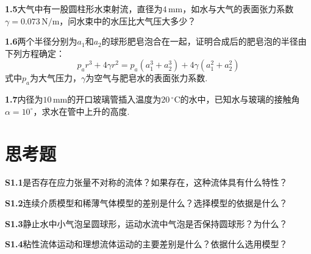 \medskip
\noindent\textbf{1.5}\quad 大气中有一股圆柱形水束射流，直径为$4\,$mm，如水与大气的表面张力系数$\gamma=0.073\,\mathrm{N/m}$，问水束中的水压比大气压大多少？

\medskip
\noindent\textbf{1.6}\quad 两个半径分别为$a_1$和$a_2$的球形肥皂泡合在一起，证明合成后的肥皂泡的半径由下列方程确定：
\[
p_a r^{3}+4\gamma r^{2}=p_a(a_1^{3}+a_2^{3})+4\gamma(a_1^{2}+a_2^{2})
\]
式中$p_a$为大气压力，$\gamma$为空气与肥皂水的表面张力系数.

\medskip
\noindent\textbf{1.7}\quad 内径为$10\,$mm的开口玻璃管插入温度为$20\,^\circ$C的水中，已知水与玻璃的接触角$\alpha=10^\circ$，求水在管中上升的高度.

\section*{思考题}

\noindent\textbf{S1.1}\quad 是否存在应力张量不对称的流体？如果存在，这种流体具有什么特性？

\medskip
\noindent\textbf{S1.2}\quad 连续介质模型和稀薄气体模型的差别是什么？选择模型的依据是什么？

\medskip
\noindent\textbf{S1.3}\quad 静止水中小气泡呈圆球形，运动水流中气泡是否保持圆球形？为什么？

\medskip
\noindent\textbf{S1.4}\quad 粘性流体运动和理想流体运动的主要差别是什么？依据什么选用模型？
